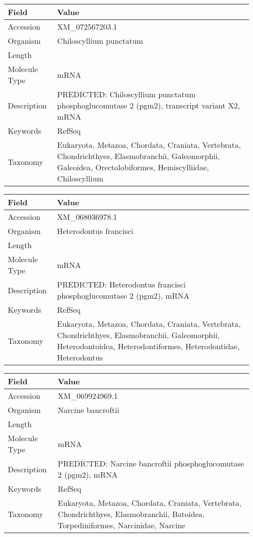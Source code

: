 \documentclass[10pt]{article}
\begin{document}
\vspace{1em}
{\footnotesize
\begin{longtable}{>{\raggedright\arraybackslash}p{4.5cm} >{\raggedright\arraybackslash}p{11.5cm}}
\textbf{Field} & \textbf{Value} \\
\hline
Accession & XM\_072567203.1 \\
Organism & Chiloscyllium punctatum \\
Length & 2665 \\
Molecule Type & mRNA \\
Description & PREDICTED: Chiloscyllium punctatum phosphoglucomutase 2 (pgm2), transcript variant X2, mRNA \\
Keywords & RefSeq \\
Taxonomy & Eukaryota, Metazoa, Chordata, Craniata, Vertebrata, Chondrichthyes, Elasmobranchii, Galeomorphii, Galeoidea, Orectolobiformes, Hemiscylliidae, Chiloscyllium \\
\end{longtable}
}

\vspace{1em}
{\footnotesize
\begin{longtable}{>{\raggedright\arraybackslash}p{4.5cm} >{\raggedright\arraybackslash}p{11.5cm}}
\textbf{Field} & \textbf{Value} \\
\hline
Accession & XM\_068036978.1 \\
Organism & Heterodontus francisci \\
Length & 3704 \\
Molecule Type & mRNA \\
Description & PREDICTED: Heterodontus francisci phosphoglucomutase 2 (pgm2), mRNA \\
Keywords & RefSeq \\
Taxonomy & Eukaryota, Metazoa, Chordata, Craniata, Vertebrata, Chondrichthyes, Elasmobranchii, Galeomorphii, Heterodontoidea, Heterodontiformes, Heterodontidae, Heterodontus \\
\end{longtable}
}

\vspace{1em}
{\footnotesize
\begin{longtable}{>{\raggedright\arraybackslash}p{4.5cm} >{\raggedright\arraybackslash}p{11.5cm}}
\textbf{Field} & \textbf{Value} \\
\hline
Accession & XM\_069924969.1 \\
Organism & Narcine bancroftii \\
Length & 2749 \\
Molecule Type & mRNA \\
Description & PREDICTED: Narcine bancroftii phosphoglucomutase 2 (pgm2), mRNA \\
Keywords & RefSeq \\
Taxonomy & Eukaryota, Metazoa, Chordata, Craniata, Vertebrata, Chondrichthyes, Elasmobranchii, Batoidea, Torpediniformes, Narcinidae, Narcine \\
\end{longtable}
}
\end{document}

